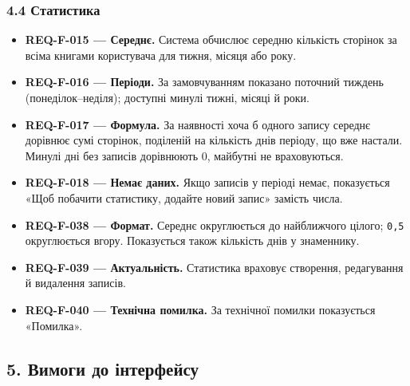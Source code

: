 \documentclass[
]{article}
\providecommand{\tightlist}{%
  \setlength{\itemsep}{0pt}\setlength{\parskip}{0pt}}
\begin{document}
\hypertarget{44-ux441ux442ux430ux442ux438ux441ux442ux438ux43aux430}{%
\subsubsection{4.4
Статистика}\label{44-ux441ux442ux430ux442ux438ux441ux442ux438ux43aux430}}

\begin{itemize}
\tightlist
\item
  \textbf{REQ-F-015 --- Середнє.} Система обчислює середню кількість
  сторінок за всіма книгами користувача для тижня, місяця або року.
\item
  \textbf{REQ-F-016 --- Періоди.} За замовчуванням показано поточний
  тиждень (понеділок--неділя); доступні минулі тижні, місяці й роки.
\item
  \textbf{REQ-F-017 --- Формула.} За наявності хоча б одного запису
  середнє дорівнює сумі сторінок, поділеній на кількість днів періоду,
  що вже настали. Минулі дні без записів дорівнюють 0, майбутні не
  враховуються.
\item
  \textbf{REQ-F-018 --- Немає даних.} Якщо записів у періоді немає,
  показується «Щоб побачити статистику, додайте новий запис» замість
  числа.
\item
  \textbf{REQ-F-038 --- Формат.} Середнє округлюється до найближчого
  цілого; \texttt{0,5} округлюється вгору. Показується також кількість
  днів у знаменнику.
\item
  \textbf{REQ-F-039 --- Актуальність.} Статистика враховує створення,
  редагування й видалення записів.
\item
  \textbf{REQ-F-040 --- Технічна помилка.} За технічної помилки
  показується «Помилка».
\end{itemize}

\hypertarget{5-ux432ux438ux43cux43eux433ux438-ux434ux43e-ux456ux43dux442ux435ux440ux444ux435ux439ux441ux443}{%
\subsection{5. Вимоги до
інтерфейсу}\label{5-ux432ux438ux43cux43eux433ux438-ux434ux43e-ux456ux43dux442ux435ux440ux444ux435ux439ux441ux443}}
\end{document}
